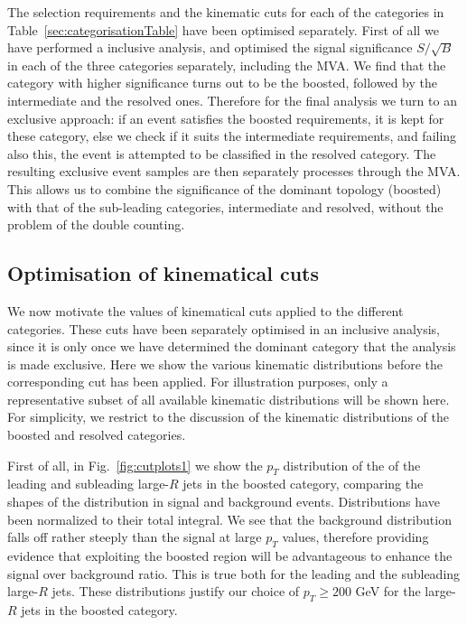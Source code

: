 The selection requirements and the kinematic cuts
for each of the categories in Table~\ref{sec:categorisationTable} have
been optimised separately.
%
First of all we have performed a inclusive analysis, and optimised the
signal significance
$S/\sqrt{B}$ in each of the three categories separately, including
the MVA.
%
We find that the category with higher significance turns out to be the boosted,
followed by the intermediate and the resolved ones.
%
Therefore for the final analysis we turn to an exclusive approach:
if an event satisfies the boosted requirements, it is kept for
these category, else we check if it suits the intermediate
requirements, and failing also this, the event is attempted to
be classified in the
resolved category.
%
The resulting exclusive event samples are then separately processes
through the MVA.
%
This allows us to combine the significance of the dominant topology
(boosted) with that of the sub-leading categories, intermediate
and resolved, without the problem of the double counting.







\subsection{Optimisation of kinematical cuts}

We now motivate the values of
kinematical cuts applied to the different categories.
%
These cuts have been separately
optimised in an inclusive analysis, since it is only
once we have determined
the dominant category that the analysis is made exclusive.
%
Here we show the various kinematic distributions 
before the corresponding cut has been applied.
%
For illustration purposes,
only a representative subset of
all available kinematic distributions will be shown here.
%
For simplicity,
we restrict to the discussion of the
kinematic distributions of the boosted
and resolved categories.


First of all,
in Fig.~\ref{fig:cutplots1} we show
the $p_T$ distribution of the 
of the
  leading and subleading large-$R$ jets in the boosted category, comparing
  the shapes of the distribution in signal and background events.
  Distributions have been normalized to their total integral.
  We see that the background distribution
  falls off rather steeply than the signal at large $p_T$
  values, therefore
  providing evidence that exploiting the boosted region will be
  advantageous to enhance the signal over background ratio.
  This is true both for the leading and the subleading
  large-$R$ jets.
  These distributions justify our choice of $p_T \ge 200$ GeV
  for the large-$R$ jets in the boosted category.
  

